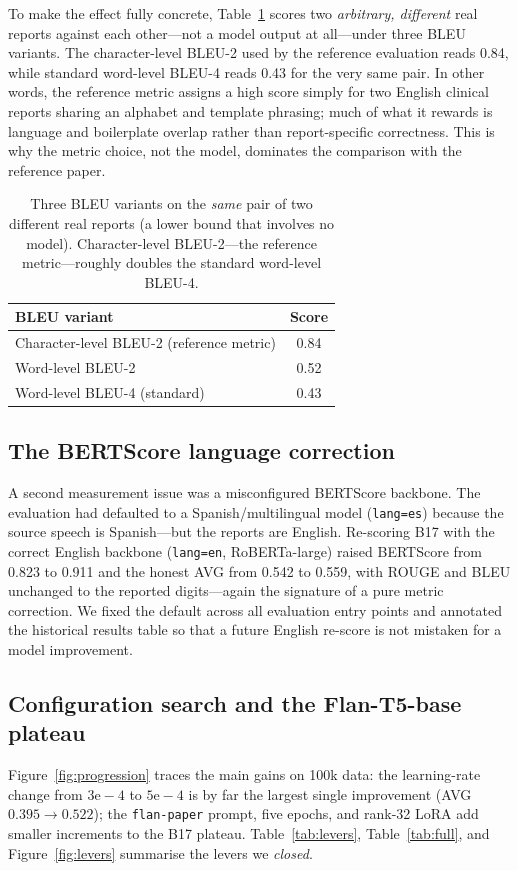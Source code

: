 \documentclass[11pt,twocolumn]{article}
\newcommand{\bt}[1]{\texttt{#1}}
\begin{document}
To make the effect fully concrete, Table~\ref{tab:bleu-demo} scores two \emph{arbitrary,
different} real reports against each other---not a model output at all---under three BLEU
variants. The character-level BLEU-2 used by the reference evaluation reads 0.84, while standard
word-level BLEU-4 reads 0.43 for the very same pair. In other words, the reference metric assigns
a high score simply for two English clinical reports sharing an alphabet and template phrasing;
much of what it rewards is language and boilerplate overlap rather than report-specific
correctness. This is why the metric choice, not the model, dominates the comparison with the
reference paper.

\begin{table}[t]
\centering
\caption{Three BLEU variants on the \emph{same} pair of two different real reports (a lower bound
that involves no model). Character-level BLEU-2---the reference metric---roughly doubles the
standard word-level BLEU-4.}
\label{tab:bleu-demo}
\small
\begin{tabular}{lc}
\toprule
BLEU variant & Score \\
\midrule
Character-level BLEU-2 (reference metric) & 0.84 \\
Word-level BLEU-2 & 0.52 \\
Word-level BLEU-4 (standard) & 0.43 \\
\bottomrule
\end{tabular}
\end{table}

\subsection{The BERTScore language correction}
A second measurement issue was a misconfigured BERTScore backbone. The evaluation had defaulted
to a Spanish/multilingual model (\bt{lang=es}) because the source speech is Spanish---but the
reports are English. Re-scoring B17 with the correct English backbone (\bt{lang=en},
RoBERTa-large) raised BERTScore from 0.823 to 0.911 and the honest AVG from 0.542 to 0.559, with
ROUGE and BLEU unchanged to the reported digits---again the signature of a pure metric correction.
We fixed the default across all evaluation entry points and annotated the historical results table
so that a future English re-score is not mistaken for a model improvement.

\subsection{Configuration search and the Flan-T5-base plateau}
Figure~\ref{fig:progression} traces the main gains on 100k data: the learning-rate change from
$3\mathrm{e}{-}4$ to $5\mathrm{e}{-}4$ is by far the largest single improvement (AVG
$0.395\rightarrow0.522$); the \bt{flan-paper} prompt, five epochs, and rank-32 LoRA add smaller
increments to the B17 plateau. Table~\ref{tab:levers}, Table~\ref{tab:full}, and
Figure~\ref{fig:levers} summarise the levers we \emph{closed}.
\end{document}
